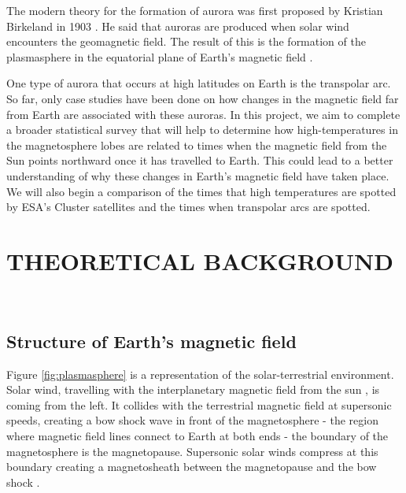\documentclass[12pt]{article}
\begin{document}
The modern theory for the formation of aurora was first proposed by Kristian Birkeland in 1903 \cite{birkeland2018norwegian}. He said that auroras are produced when solar wind encounters the geomagnetic field. The result of this is the formation of the plasmasphere in the equatorial plane of Earth's magnetic field \cite{cosmicelectrodyn}.

One type of aurora that occurs at high latitudes on Earth is the transpolar arc. So far, only case studies have been done on how changes in the magnetic field far from Earth are associated with these auroras. In this project, we aim to complete a broader statistical survey that will help to determine how high-temperatures in the magnetosphere lobes are related to times when the magnetic field from the Sun points northward once it has travelled to Earth. This could lead to a better understanding of why these changes in Earth's magnetic field have taken place. We will also begin a comparison of the times that high temperatures are spotted by ESA's Cluster satellites and the times when transpolar arcs are spotted.

\section{THEORETICAL BACKGROUND}
\hfill \\
\hfill

\subsection{Structure of Earth's magnetic field}
Figure \ref{fig:plasmasphere} is a representation of the solar-terrestrial environment. Solar wind, travelling with the interplanetary magnetic field from the sun \cite{Svalgaard_2010}, is coming from the left. It collides with the terrestrial magnetic field at supersonic speeds, creating a bow shock wave in front of the magnetosphere - the region where magnetic field lines connect to Earth at both ends - the boundary of the magnetosphere is the magnetopause. Supersonic solar winds compress at this boundary creating a magnetosheath between the magnetopause and the bow shock \cite{BSPP}.
\end{document}
